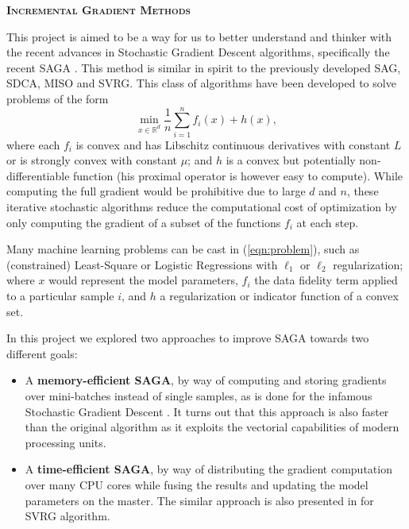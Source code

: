 \documentclass[a4paper,11pt]{article}
\newcommand{\R}{\mathbb{R}}
\newcommand{\eqnref}[1]{(\ref{eqn:#1})}
\begin{document}
\begin{center}
	\Large{\textbf{\textsc{Incremental Gradient Methods}}}
\end{center}

This project is aimed to be a way for us to better understand and thinker with
the recent advances in Stochastic Gradient Descent algorithms, specifically
the recent SAGA \cite{defazio_saga_2014}. This method is similar in spirit to
the previously developed SAG, SDCA, MISO and SVRG. This class of algorithms have
been developed to solve problems of the form
\begin{equation} \label{eqn:problem}
	\min_{x \in \R^d} \frac{1}{n} \sum_{i=1}^n f_i(x) + h(x),
\end{equation}
where each $f_i$ is convex and has Libschitz continuous derivatives with
constant $L$ or is strongly convex with constant $\mu$; and $h$ is a convex but
potentially non-differentiable function (his proximal operator is however easy
to compute). While computing the full gradient would be prohibitive due to large
$d$ and $n$, these iterative stochastic algorithms reduce the computational cost
of optimization by only computing the gradient of a subset of the functions
$f_i$ at each step.

Many machine learning problems can be cast in \eqnref{problem}, such as
(constrained) Least-Square or Logistic Regressions with $\ell_1$ or $\ell_2$
regularization; where $x$ would represent the model parameters, $f_i$ the data
fidelity term applied to a particular sample $i$, and $h$ a regularization or
indicator function of a convex set.

In this project we explored two approaches to improve SAGA towards two different
goals:
\begin{itemize}
	\item A \textbf{memory-efficient SAGA}, by way of computing and storing
		gradients over mini-batches instead of single samples, as is done for
		the infamous Stochastic Gradient Descent \cite{konevcny2014ms2gd}. It turns out that this
		approach is also faster than the original algorithm as it exploits the
		vectorial capabilities of modern processing units.
	\item A \textbf{time-efficient SAGA}, by way of distributing the gradient
		computation over many CPU cores while fusing the results and updating
		the model parameters on the master. The similar approach is also presented in \cite{lee2015distributed} for SVRG algorithm.
\end{itemize}
\end{document}
